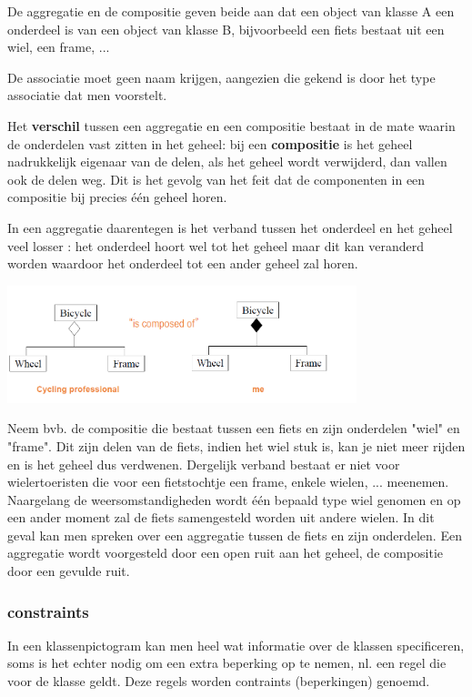 De aggregatie en de compositie geven beide aan dat een object van klasse A een onderdeel is van een object van klasse B, bijvoorbeeld een fiets bestaat uit een wiel, een frame, ...

De associatie moet geen naam krijgen, aangezien die gekend is door het type associatie dat men voorstelt.

Het \textbf{verschil} tussen een aggregatie en een compositie bestaat in de mate waarin de onderdelen vast zitten in het geheel: bij een \textbf{compositie} is het geheel nadrukkelijk eigenaar van de delen, als het geheel wordt verwijderd, dan vallen ook de delen weg. Dit is het gevolg van het feit dat de componenten in een compositie bij precies één geheel horen.

In een aggregatie daarentegen is het verband tussen het onderdeel en het
geheel veel losser : het onderdeel hoort wel tot het geheel maar dit kan veranderd worden waardoor het onderdeel tot een ander geheel zal horen.


\begin{center}
\includegraphics[width=4in]{img/aggcom}%
\end{center}

Neem bvb. de compositie die bestaat tussen een fiets en zijn onderdelen "wiel" en "frame". Dit zijn delen van de fiets, indien het wiel stuk is, kan je niet meer rijden en is het geheel dus verdwenen.
Dergelijk verband bestaat er niet voor wielertoeristen die voor een fietstochtje een frame, enkele wielen, ... meenemen. Naargelang de weersomstandigheden wordt één bepaald type wiel genomen en op een ander moment zal de fiets samengesteld worden uit andere wielen. In dit geval kan men spreken over een aggregatie tussen de fiets en zijn onderdelen.
Een aggregatie wordt voorgesteld door een open ruit aan het geheel, de compositie door een gevulde ruit.

\subsubsection{constraints}

In een klassenpictogram kan men heel wat informatie over de klassen specificeren, soms is het echter nodig om een extra beperking op te nemen, nl. een regel die voor de klasse geldt. Deze regels worden contraints (beperkingen) genoemd.

